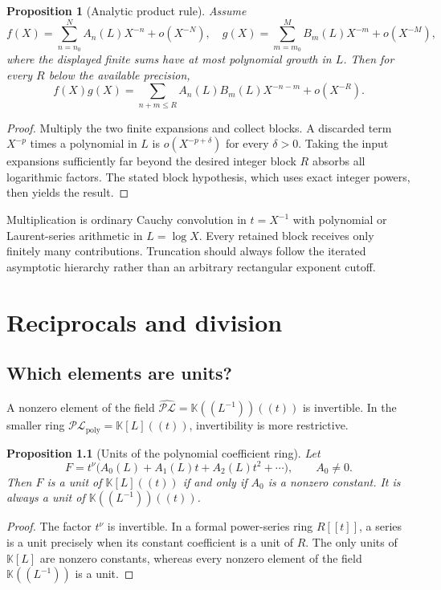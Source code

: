 \documentclass[11pt,oneside]{book}
\newtheorem{proposition}[theorem]{Proposition}
\theoremstyle{definition}
\theoremstyle{remark}
\newcommand{\K}{\mathbb K}
\newcommand{\PLpoly}{\mathscr{PL}_{\mathrm{poly}}}
\newcommand{\PLfield}{\widehat{\mathscr{PL}}}
\begin{document}
\begin{proposition}[Analytic product rule]\label{prop:analytic-product}
Assume
\[
 f(X)=\sum_{n=n_0}^{N}A_n(L)X^{-n}+o(X^{-N}),
 \quad
 g(X)=\sum_{m=m_0}^{M}B_m(L)X^{-m}+o(X^{-M}),
\]
where the displayed finite sums have at most polynomial growth in $L$.  Then
for every $R$ below the available precision,
\[
 f(X)g(X)=\sum_{n+m\le R}A_n(L)B_m(L)X^{-n-m}
 +o(X^{-R}).
\]
\end{proposition}
\begin{proof}
Multiply the two finite expansions and collect blocks.  A discarded term
$X^{-p}$ times a polynomial in $L$ is $o(X^{-p+\delta})$ for every
$\delta>0$.  Taking the input expansions sufficiently far beyond the desired
integer block $R$ absorbs all logarithmic factors.  The stated block
hypothesis, which uses exact integer powers, then yields the result.
\end{proof}

\begin{summarybox}
Multiplication is ordinary Cauchy convolution in $t=X^{-1}$ with polynomial or
Laurent-series arithmetic in $L=\log X$.  Every retained block receives only
finitely many contributions.  Truncation should always follow the iterated
asymptotic hierarchy rather than an arbitrary rectangular exponent cutoff.
\end{summarybox}


\chapter{Reciprocals and division}
\label{ch:division}

\section{Which elements are units?}
A nonzero element of the field $\PLfield=\K((L^{-1}))((t))$ is invertible.
In the smaller ring $\PLpoly=\K[L]((t))$, invertibility is more restrictive.

\begin{proposition}[Units of the polynomial coefficient ring]
Let
\[
 F=t^\nu\bigl(A_0(L)+A_1(L)t+A_2(L)t^2+\cdots\bigr),
 \qquad A_0\ne0.
\]
Then $F$ is a unit of $\K[L]((t))$ if and only if $A_0$ is a nonzero constant.
It is always a unit of $\K((L^{-1}))((t))$.
\end{proposition}
\begin{proof}
The factor $t^\nu$ is invertible.  In a formal power-series ring $R[[t]]$, a
series is a unit precisely when its constant coefficient is a unit of $R$.
The only units of $\K[L]$ are nonzero constants, whereas every nonzero element
of the field $\K((L^{-1}))$ is a unit.
\end{proof}
\end{document}
